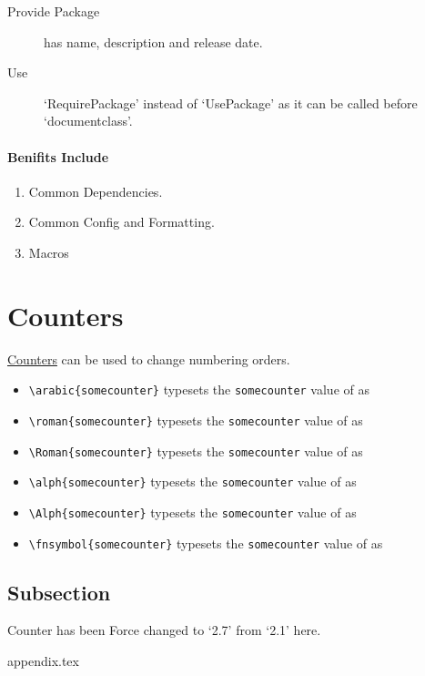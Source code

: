 \documentclass{report}[a4paper,12pt] %
\begin{document}
\begin{description}
  \item[Provide Package] has name, description and release date.
  \item[Use] `RequirePackage' instead of `UsePackage' as it can be called before `documentclass'.
\end{description}

\paragraph{Benifits Include}
\begin{enumerate}
  \item Common Dependencies.
  \item Common Config and Formatting.
  \item Macros
\end{enumerate}

\section{Counters}
\href{https://www.overleaf.com/learn/latex/Counters}{Counters} can be used to change numbering orders.

\setcounter{somecounter}{9}
\begin{itemize}
    \item \verb|\arabic{somecounter}| typesets the \texttt{somecounter} value of  \thesomecounter{} as  
    \item \verb|\roman{somecounter}| typesets the \texttt{somecounter} value of  \thesomecounter{} as  
    \item \verb|\Roman{somecounter}| typesets the \texttt{somecounter} value of  \thesomecounter{} as  
    \item \verb|\alph{somecounter}| typesets the \texttt{somecounter} value of  \thesomecounter{} as  
   \item \verb|\Alph{somecounter}| typesets the \texttt{somecounter} value of  \thesomecounter{} as  
    \item \verb|\fnsymbol{somecounter}| typesets the \texttt{somecounter} value of  \thesomecounter{} as  
\end{itemize}

\setcounter{subsection}{6}
\subsection{Subsection}
Counter has been Force changed to `2.7' from `2.1' here.

{appendix.tex}
\end{document}
